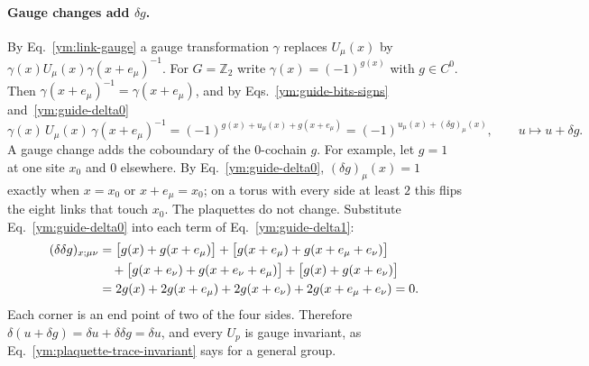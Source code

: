 \paragraph{Gauge changes add $\delta g$.}
By Eq.~\eqref{ym:link-gauge} a gauge transformation $\gamma$ replaces
$U_\mu(x)$ by $\gamma(x)U_\mu(x)\gamma(x+e_\mu)^{-1}$. For
$G=\mathbb Z_2$ write $\gamma(x)=(-1)^{g(x)}$ with $g\in C^0$. Then
$\gamma(x+e_\mu)^{-1}=\gamma(x+e_\mu)$, and by
Eqs.~\eqref{ym:guide-bits-signs} and~\eqref{ym:guide-delta0}
\begin{equation}\label{ym:guide-z2-gauge}
 \gamma(x)\,U_\mu(x)\,\gamma(x+e_\mu)^{-1}
 =(-1)^{g(x)+u_\mu(x)+g(x+e_\mu)}
 =(-1)^{u_\mu(x)+(\delta g)_\mu(x)},
 \qquad u\longmapsto u+\delta g .
\end{equation}
A gauge change adds the coboundary of the $0$-cochain $g$. For example, let
$g=1$ at one site $x_0$ and $0$ elsewhere. By Eq.~\eqref{ym:guide-delta0},
$(\delta g)_\mu(x)=1$ exactly when $x=x_0$ or $x+e_\mu=x_0$; on a torus
with every side at least $2$ this flips the eight links that touch $x_0$.
The plaquettes do not change. Substitute Eq.~\eqref{ym:guide-delta0} into
each term of Eq.~\eqref{ym:guide-delta1}:
\begin{align}
 (\delta\delta g)_{x;\mu\nu}
 &=\big[g(x)+g(x+e_\mu)\big]+\big[g(x+e_\mu)+g(x+e_\mu+e_\nu)\big]\notag\\
 &\quad+\big[g(x+e_\nu)+g(x+e_\nu+e_\mu)\big]+\big[g(x)+g(x+e_\nu)\big]\notag\\
 &=2g(x)+2g(x+e_\mu)+2g(x+e_\nu)+2g(x+e_\mu+e_\nu)=0 .
 \label{ym:guide-delta-delta-g}
\end{align}
Each corner is an end point of two of the four sides. Therefore
$\delta(u+\delta g)=\delta u+\delta\delta g=\delta u$, and every $U_p$ is
gauge invariant, as Eq.~\eqref{ym:plaquette-trace-invariant} says for a
general group.

